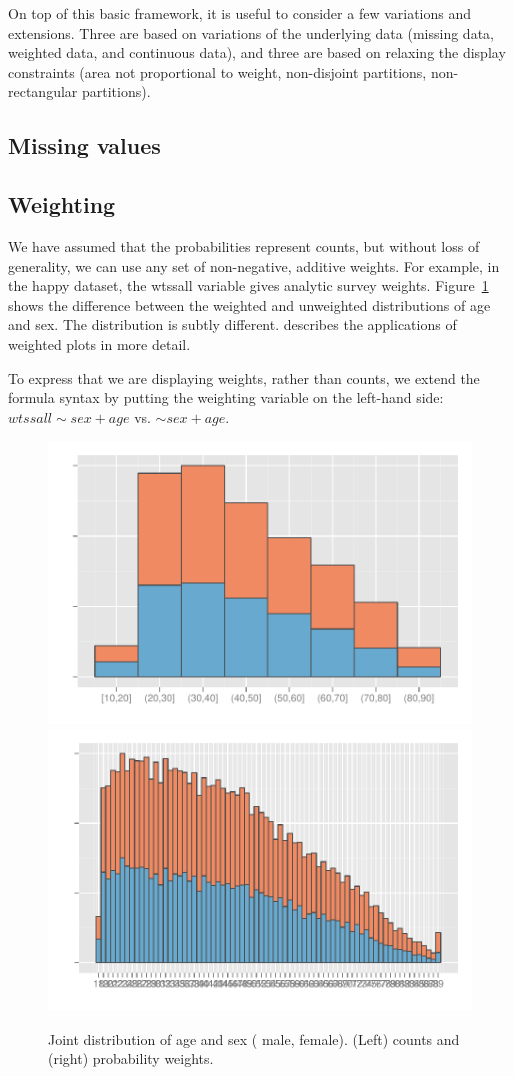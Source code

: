 \documentclass[letterpaper,oneside]{scrartcl}
\newcommand{\key}[1]
  {\protect \tikz{\fill[#1] rectangle (1ex,1ex);}}
\begin{document}
On top of this basic framework, it is useful to consider a few variations and extensions.  Three are based on variations of the underlying data (missing data, weighted data, and continuous data), and three are based on relaxing the display constraints (area not proportional to weight, non-disjoint partitions, non-rectangular partitions).


\subsection{Missing values}
\label{sub:missing_values}


\subsection{Weighting}
\label{sub:weighting}

We have assumed that the probabilities represent counts, but without loss of generality, we can use any set of non-negative, additive weights. For example, in the happy dataset, the {\sf wtssall} variable gives analytic survey weights. Figure~\ref{fig:weighting} shows the difference between the weighted and unweighted distributions of age and sex. The distribution is subtly different. \citep{unwin:2007} describes the applications of weighted plots in more detail.

To express that we are displaying weights, rather than counts, we extend the formula syntax by putting the weighting variable on the left-hand side: $wtssall \sim sex + age$ vs. $ \sim sex + age$.

\begin{figure}[htbp]
  \centering
    \includegraphics[width=0.5\linewidth]{wt-count}%
    \includegraphics[width=0.5\linewidth]{wt-wtssall}%
  \caption{Joint distribution of age and sex (\key{male} male, \key{female} female). (Left) counts and (right) probability weights.}
  \label{fig:weighting}
\end{figure}
\end{document}
